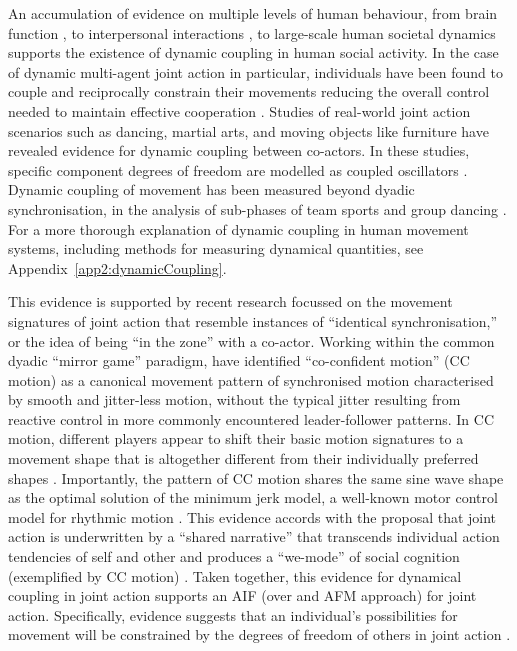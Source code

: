 \begin{CJK}{UTF8}{gbsn}
An accumulation of evidence on multiple levels of human behaviour, from brain function \citep{Yufik1998,Sengupta2013}, to interpersonal interactions \citep{Kelso2009,Riley2011,Fusaroli2014}, to large-scale human societal dynamics \citep{Nowak2017} supports the existence of dynamic coupling in human social activity.  In the case of dynamic multi-agent joint action in particular, individuals have been found to couple and reciprocally constrain their movements reducing the overall control needed to maintain effective cooperation \citep{Ramenzoni2011,Ramenzoni2012,Riley2011,Schmidt1990}.  Studies of real-world joint action scenarios such as dancing, martial arts, and moving objects like furniture have revealed evidence for dynamic coupling between co-actors.  In these studies, specific component degrees of freedom are modelled as coupled oscillators \citep[using the HKB model, which describes the change in the relative phase between two oscillatory components. See][]{Haken1985,Kelso1986}.  Dynamic coupling of movement has been measured beyond dyadic synchronisation, in the analysis of sub-phases of team sports  \citep{Passos2014,Duarte2012} and group dancing \citep{Chauvigne2017}.  For a more thorough explanation of dynamic coupling in human movement systems, including methods for measuring dynamical quantities, see Appendix~\ref{app2:dynamicCoupling}.

This evidence is supported by recent research focussed on the movement signatures of joint action that resemble instances of ``identical synchronisation,'' or the idea of being ``in the zone'' with a co-actor. Working within the common dyadic ``mirror game'' paradigm, \textcite{Noy2011,Noy2015,Hart2014} have identified ``co-confident motion'' (CC motion) as a canonical movement pattern of synchronised motion characterised by smooth and jitter-less motion, without the typical jitter resulting from reactive control in more commonly encountered leader-follower patterns.  In CC motion, different players appear to shift their basic motion signatures to a movement shape that is altogether different from their individually preferred shapes \citep{Hart2014}. Importantly, the pattern of CC motion shares the same sine wave shape as the optimal solution of the minimum jerk model, a well-known motor control model for rhythmic motion \citep{Hogan2007}.  This evidence accords with the proposal that joint action is underwritten by a ``shared narrative'' that transcends individual action tendencies of self and other and produces a  ``we-mode'' of social cognition (exemplified by CC motion) \citep{Gallotti2013}.  Taken together, this evidence for dynamical coupling in joint action supports an AIF (over and AFM approach) for joint action.  Specifically, evidence suggests that an individual's possibilities for movement will be constrained by the degrees of freedom of others in joint action \citep{Richardson2015}.


\end{CJK}
